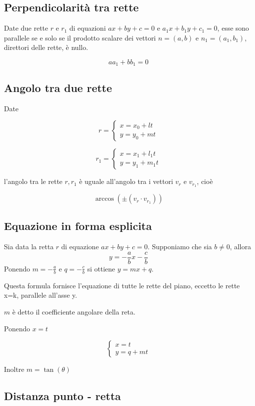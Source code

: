 \subsection{Perpendicolarità tra rette}

Date due rette $r$ e $r_1$ di equazioni $ax+by+c=0$ e $a_1x+b_1y+c_1=0$, esse sono parallele se e solo se il prodotto scalare dei vettori $n  = (a,b)$ e $n_1 = (a_1,b_1)$, direttori delle rette, è nullo.

$$aa_1+bb_1 = 0$$

\subsection{Angolo tra due rette}

Date

$$
r = \begin{cases}
x = x_0 + lt \\
y = y_0 + mt
\end{cases}
$$

$$
r_1 = \begin{cases}
x = x_1 + l_1t \\
y = y_1 + m_1t
\end{cases}
$$

l'angolo tra le rette $r,r_1$ è uguale all'angolo tra i vettori $v_r$ e $v_{r_1}$, cioè

$$\arccos(\pm (v_r \cdot v_{r_1}))$$

\subsection{Equazione in forma esplicita}

Sia data la retta $r$ di equazione $ax+by+c=0$. Supponiamo che sia $b \neq 0$, allora
$$y = -\frac{a}{b} x - \frac{c}{b}$$
Ponendo $m= -\frac{a}{b}$ e $q = -\frac{c}{b}$ si ottiene $y=mx+q$.

Questa formula fornisce l'equazione di tutte le rette del piano, eccetto le rette x=k, parallele all'asse y.

$m$ è detto il coefficiente angolare della reta.

Ponendo $x=t$

$$
\begin{cases}
x= t \\
y=q+mt
\end{cases}
$$

Inoltre
$m = \tan(\theta)$


\subsection{Distanza punto - retta}

